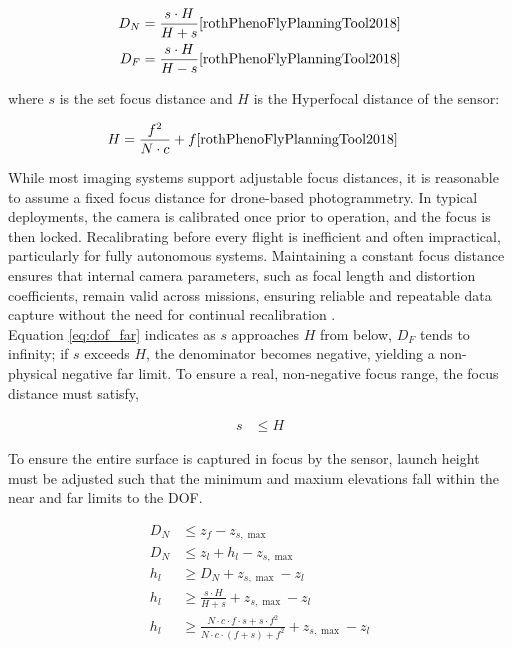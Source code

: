 \documentclass[11pt]{article}
\begin{document}
\begin{align}
    D_N &= \frac{s\cdot H}{H + s} \cite{rothPhenoFlyPlanningTool2018}\\
    D_F &= \frac{s\cdot H}{H - s} \cite{rothPhenoFlyPlanningTool2018} \label{eq:dof_far}\\ 
\end{align}

\noindent 
where $s$ is the set focus distance and $H$ is the Hyperfocal distance of the sensor:

\begin{align}
    H &= \frac{f^2}{N \cdot c} + f \label{eq:hyperfocal} \cite{rothPhenoFlyPlanningTool2018}
\end{align}

\noindent
While most imaging systems support adjustable focus distances, it is reasonable to assume a fixed focus distance for drone-based photogrammetry. In typical deployments, the camera is calibrated once prior to operation, and the focus is then locked. Recalibrating before every flight is inefficient and often impractical, particularly for fully autonomous systems. Maintaining a constant focus distance ensures that internal camera parameters, such as focal length and distortion coefficients, remain valid across missions, ensuring reliable and repeatable data capture without the need for continual recalibration \cite{luhmannSensorModellingCamera2016}.\\

\noindent
Equation \ref{eq:dof_far} indicates as $s$ approaches $H$ from below, $D_F$ tends to infinity; if $s$ exceeds $H$, the denominator becomes negative, yielding a non-physical negative far limit. To ensure a real, non-negative focus range, the focus distance must satisfy, 

\begin{align}
  s &\leq H
\end{align}

\noindent
To ensure the entire surface is captured in focus by the sensor, launch height must be adjusted such that the minimum and maxium elevations fall within the near and far limits to the DOF.

\begin{align}
    D_N &\leq z_f - z_{s,\max}\\
    D_N &\leq z_l + h_l - z_{s,\max}\\
    h_l &\geq D_N + z_{s,\max} - z_l\\
    h_l &\geq \frac{s\cdot H}{H + s} + z_{s,\max} - z_l\\
    h_l &\geq \frac{N \cdot c \cdot f \cdot s + s \cdot f^2}{N \cdot c \cdot (f+s) + f^2} + z_{s,\max} - z_l \label{eq:hD_N}
\end{align}
\end{document}
